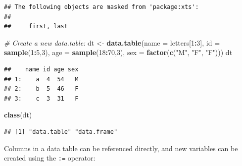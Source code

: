 \documentclass[
]{book}
\newenvironment{Shaded}{\begin{snugshade}}{\end{snugshade}}
\newcommand{\AttributeTok}[1]{\textcolor[rgb]{0.13,0.29,0.53}{#1}}
\newcommand{\CommentTok}[1]{\textcolor[rgb]{0.56,0.35,0.01}{\textit{#1}}}
\newcommand{\DecValTok}[1]{\textcolor[rgb]{0.00,0.00,0.81}{#1}}
\newcommand{\FunctionTok}[1]{\textcolor[rgb]{0.13,0.29,0.53}{\textbf{#1}}}
\newcommand{\NormalTok}[1]{#1}
\newcommand{\OtherTok}[1]{\textcolor[rgb]{0.56,0.35,0.01}{#1}}
\newcommand{\SpecialCharTok}[1]{\textcolor[rgb]{0.81,0.36,0.00}{\textbf{#1}}}
\newcommand{\StringTok}[1]{\textcolor[rgb]{0.31,0.60,0.02}{#1}}
\begin{document}
\begin{verbatim}
## The following objects are masked from 'package:xts':
## 
##     first, last
\end{verbatim}

\begin{Shaded}
\begin{Highlighting}[]
\CommentTok{\# Create a new data.table:}
\NormalTok{dt }\OtherTok{\textless{}{-}} \FunctionTok{data.table}\NormalTok{(}\AttributeTok{name =}\NormalTok{ letters[}\DecValTok{1}\SpecialCharTok{:}\DecValTok{3}\NormalTok{], }
                 \AttributeTok{id =} \FunctionTok{sample}\NormalTok{(}\DecValTok{1}\SpecialCharTok{:}\DecValTok{5}\NormalTok{,}\DecValTok{3}\NormalTok{),}
                 \AttributeTok{age =} \FunctionTok{sample}\NormalTok{(}\DecValTok{18}\SpecialCharTok{:}\DecValTok{70}\NormalTok{,}\DecValTok{3}\NormalTok{), }
                 \AttributeTok{sex =} \FunctionTok{factor}\NormalTok{(}\FunctionTok{c}\NormalTok{(}\StringTok{"M"}\NormalTok{, }\StringTok{"F"}\NormalTok{, }\StringTok{"F"}\NormalTok{)))}
\NormalTok{dt}
\end{Highlighting}
\end{Shaded}

\begin{verbatim}
##    name id age sex
## 1:    a  4  54   M
## 2:    b  5  46   F
## 3:    c  3  31   F
\end{verbatim}

\begin{Shaded}
\begin{Highlighting}[]
\FunctionTok{class}\NormalTok{(dt)}
\end{Highlighting}
\end{Shaded}

\begin{verbatim}
## [1] "data.table" "data.frame"
\end{verbatim}

Columns in a data table can be referenced directly, and new variables can be created using the \texttt{:=} operator:

\begin{Shaded}
\end{Shaded}
\end{document}
